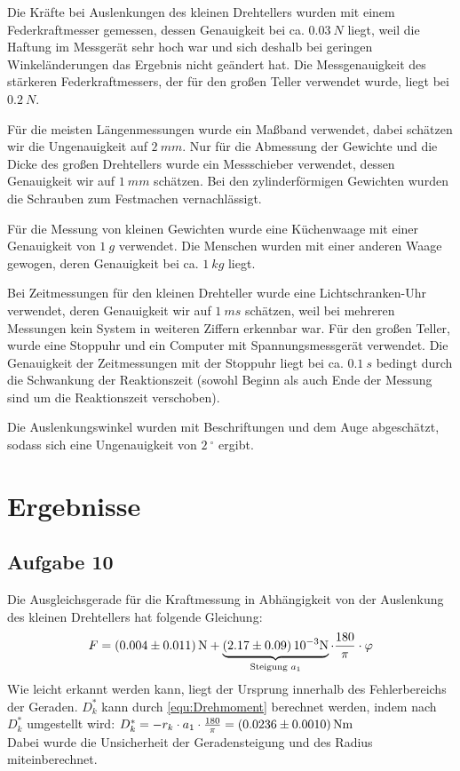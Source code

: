 \documentclass[a4paper, 11pt, ngerman]{scrartcl}
\begin{document}
Die Kräfte bei Auslenkungen des kleinen Drehtellers wurden mit einem Federkraftmesser gemessen, dessen Genauigkeit bei ca. $\SI{0.03}{N}$ liegt, weil die Haftung im Messgerät sehr hoch war und sich deshalb bei geringen Winkeländerungen das Ergebnis nicht geändert hat. Die Messgenauigkeit des stärkeren Federkraftmessers, der für den großen Teller verwendet wurde, liegt bei $\SI{0.2}{N}$.

Für die meisten Längenmessungen wurde ein Maßband verwendet, dabei schätzen wir die Ungenauigkeit auf $\SI{2}{mm}$. Nur für die Abmessung der Gewichte und die Dicke des großen Drehtellers wurde ein Messschieber verwendet, dessen Genauigkeit wir auf $\SI{1}{mm}$ schätzen. Bei den zylinderförmigen Gewichten wurden die Schrauben zum Festmachen vernachlässigt.

Für die Messung von kleinen Gewichten wurde eine Küchenwaage mit einer Genauigkeit von $\SI{1}{g}$ verwendet. Die Menschen wurden mit einer anderen Waage gewogen, deren Genauigkeit bei ca. $\SI{1}{kg}$ liegt.

Bei Zeitmessungen für den kleinen Drehteller wurde eine Lichtschranken-Uhr verwendet, deren Genauigkeit wir auf $\SI{1}{ms}$ schätzen, weil bei mehreren Messungen kein System in weiteren Ziffern erkennbar war. Für den großen Teller, wurde eine Stoppuhr und ein Computer mit Spannungsmessgerät verwendet. Die Genauigkeit der Zeitmessungen mit der Stoppuhr liegt bei ca. $\SI{0.1}{s}$ bedingt durch die Schwankung der Reaktionszeit (sowohl Beginn als auch Ende der Messung sind um die Reaktionszeit verschoben).

Die Auslenkungswinkel wurden mit Beschriftungen und dem Auge abgeschätzt, sodass sich eine Ungenauigkeit von $\SI{2}{^\circ}$ ergibt.

\section{Ergebnisse}
\subsection{Aufgabe 10}

Die Ausgleichsgerade für die Kraftmessung in Abhängigkeit von der Auslenkung des kleinen Drehtellers hat folgende Gleichung:
\begin{equation}
F = \SI{0.004 \pm 0.011}{N} + \underbrace{\SI{2.17 \pm 0.09}{10^{-3}N}}_{\text{Steigung } a_1} \cdot \frac{180}{\pi} \cdot \varphi
\end{equation}
Wie leicht erkannt werden kann, liegt der Ursprung innerhalb des Fehlerbereichs der Geraden. $D^*_k$ kann durch \cref{equ:Drehmoment} berechnet werden, indem nach $D^*_k$ umgestellt wird: $D^*_k = -r_k \cdot a_1 \cdot \frac{180}{\pi} = \SI{0.0236 \pm 0.0010}{Nm}$\\
Dabei wurde die Unsicherheit der Geradensteigung und des Radius miteinberechnet.
\end{document}
